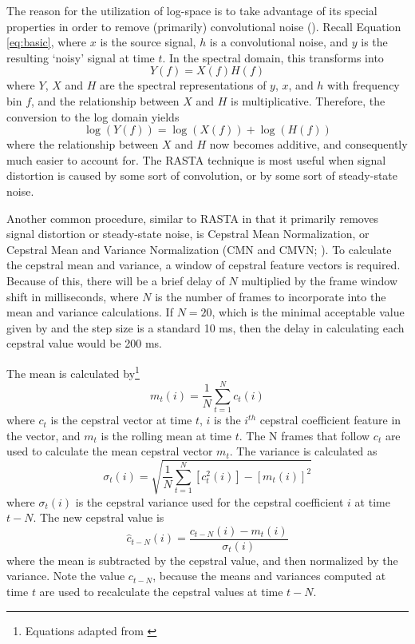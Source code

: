 The reason for the utilization of log-space is to take advantage of its special properties in order to remove (primarily) convolutional noise (\cite{gold:11}).  Recall Equation \ref{eq:basic}, where $x$ is the source signal, $h$ is a convolutional noise, and $y$ is the resulting `noisy' signal at time $t$.  In the spectral domain, this transforms into \begin{equation} Y(f) = X(f)H(f) \end{equation} where $Y$, $X$ and $H$ are the spectral representations of $y$, $x$, and $h$ with frequency bin $f$, and the relationship between $X$ and $H$ is multiplicative.  Therefore, the conversion to the log domain yields \begin{equation} \log(Y(f)) = \log(X(f)) + \log(H(f)) \end{equation} where the relationship between $X$ and $H$ now becomes additive, and consequently much easier to account for.  The RASTA technique is most useful when signal distortion is caused by some sort of convolution, or by some sort of steady-state noise.

Another common procedure, similar to RASTA in that it primarily removes signal distortion or steady-state noise, is Cepstral Mean Normalization, or Cepstral Mean and Variance Normalization (CMN and CMVN; \cite{atal:74,viikki:98}).  To calculate the cepstral mean and variance, a window of cepstral feature vectors is required.  Because of this, there will be a brief delay of $N$ multiplied by the frame window shift in milliseconds, where $N$ is the number of frames to incorporate into the mean and variance calculations.  If $N=20$, which is the minimal acceptable value given by \cite{viikki:98} and the step size is a standard 10 ms, then the delay in calculating each cepstral value would be 200 ms.

The mean is calculated by\footnote{Equations adapted from \cite{viikki:98}} \begin{equation} m_t(i) = \dfrac{1}{N}\sum_{t=1}^{N} c_{t}(i) \end{equation} where $c_t$ is the cepstral vector at time $t$, $i$ is the $i^{th}$ cepstral coefficient feature in the vector, and $m_t$ is the rolling mean at time $t$.  The N frames that follow $c_t$ are used to calculate the mean cepstral vector $m_t$.  The variance is calculated as \begin{equation} \sigma_t(i) = \sqrt{\dfrac{1}{N}\sum_{t=1}^{N} [c_t^2(i)] - [m_t(i)]^2} \end{equation} where $\sigma_t(i)$ is the cepstral variance used for the cepstral coefficient $i$ at time $t-N$.  The new cepstral value is \begin{equation} \hat{c}_{t-N}(i) =  \dfrac{c_{t-N}(i) - m_t(i)}{\sigma_{t}(i)} \end{equation} where the mean is subtracted by the cepstral value, and then normalized by the variance.  Note the value $c_{t-N}$, because the means and variances computed at time $t$ are used to recalculate the cepstral values at time $t-N$.

